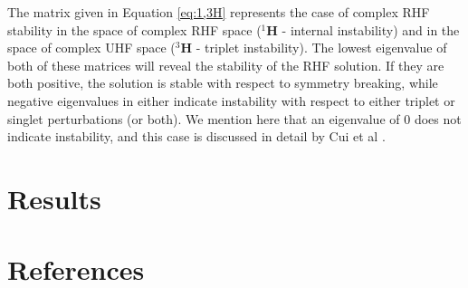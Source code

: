 \documentclass{revtex4}
\begin{document}
    The matrix given in Equation \ref{eq:1,3H} represents the case of complex RHF stability in the 
    space of complex RHF space (${}^{1}\mathbf{H}$ - internal instability) and in the space of 
    complex UHF space (${}^{3}\mathbf{H}$ - triplet instability). The lowest eigenvalue of both of 
    these matrices will reveal the stability of the RHF solution. If they are both positive, the 
    solution is stable with respect to symmetry breaking, while negative eigenvalues in either 
    indicate instability with respect to either triplet or singlet perturbations (or both). We 
    mention here that an eigenvalue of 0 does not indicate instability, and this case is discussed 
    in detail by Cui et al \cite{Cui2013}.
    
    \section{Results}
    
    

\section{References}

\end{document}
